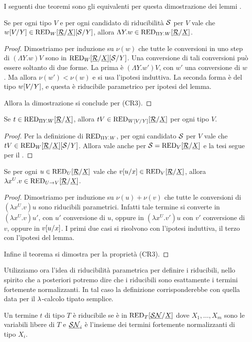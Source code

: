 \documentclass[]{marticle}
\begin{document}
I seguenti due teoremi sono gli equivalenti per questa dimostrazione dei lemmi
.
\begin{block} [Lemma]
    Se per ogni tipo $V$ e per ogni candidato di riducibilit\`a $\mathcal{S}$ per
    $V$ vale che $w[V/Y]\in\text{RED}_{W}[\underline{\mathcal{R}}/\underline{X}][\mathcal{S}/Y]$, allora $\Lambda
    Y. w\in\text{RED}_{\Pi Y.W}[\underline{\mathcal{R}}/\underline{X}]$.
\begin{proof}
    Dimostriamo per induzione su $\nu(w)$ che tutte le conversioni in uno step
    di $(\Lambda Y.w)V$ sono in $\text{RED}_{W} [\underline{\mathcal{R}}/\underline{X}][\mathcal{S}/Y]$. Una
    conversione di tali conversioni pu\`o essere soltanto di due forme.  La
    prima \`e $(\Lambda Y.w')V$, con $w'$ una conversione di $w$. Ma allora
    $\nu(w')<\nu(w)$ e si usa l'ipotesi induttiva. La seconda forma \`e del tipo
    $w[V/Y]$, e questa \`e riducibile parametrico per ipotesi del lemma. 

    Allora la dimostrazione si conclude per (CR3).
\end{proof}
\end{block}

\begin{block} [Lemma]
    Se $t\in \text{RED}_{\Pi Y.W}[\underline{\mathcal{R}}/\underline{X}]$, allora $tV\in \text{RED}_{W[V/Y]}[\underline{\mathcal{R}}/\underline{X}]$ per
    ogni tipo $V$.
\begin{proof}
    Per la definizione di $\text{RED}_{\Pi Y.W}$, per ogni candidato $\mathcal{S}$ per $V$
    vale che $tV\in \text{RED}_{W}[\underline{\mathcal{R}}/\underline{X}][\mathcal{S}/Y]$. Allora vale anche per
    $\mathcal{S} = \text{RED}_{V}[\underline{\mathcal{R}}/\underline{X}]$ e la tesi segue per il .
\end{proof}
\end{block}

\begin{block} [Lemma]
    Se per ogni $u\in \text{RED}_{U}[\underline{\mathcal{R}}/\underline{X}]$ vale che $v[u/x] \in \text{RED}_{V}[\underline{\mathcal{R}}/\underline{X}]$,
    allora $\lambda x^U.v\in \text{RED}_{U\rightarrow V}[\underline{\mathcal{R}}/\underline{X}]$.
\begin{proof}
    Dimostriamo per induzione su $\nu(u)+\nu(v)$ che tutte le conversioni di
    $(\lambda x^U.v)u$ sono riducibili parametrici. Infatti tale termine si
    converte in $(\lambda x^U.v)u'$, con $u'$ conversione di $u$, oppure in
    $(\lambda x^U.v')u$ con $v'$ conversione di $v$, oppure in $v[u/x]$. I
    primi due casi si risolvono con l'ipotesi induttiva, il terzo con l'ipotesi
    del lemma.

    Infine il teorema si dimostra per la propriet\`a (CR3).
\end{proof}
\end{block}

Utilizziamo ora l'idea di riducibilit\`a parametrica per definire i riducibili,
nello spirito che a posteriori potremo dire che i riducibili sono esattamente i
termini fortemente normalizzanti. In tal caso la definizione corrisponderebbe
con quella data per il $\lambda$-calcolo tipato semplice.
\begin{block} [Definizione]
    Un termine $t$ di tipo $T$ \`e riducibile se \`e in
    $\text{RED}_{T}[\underline{\mathcal{SN}}/\underline{X}]$ dove $X_1,\dots,X_m$ sono
    le variabili libere di $T$ e $\underline{\mathcal{SN}}_i$ \`e l'insieme dei
    termini fortemente normalizzanti di tipo $X_i$.
\end{block}
\end{document}
